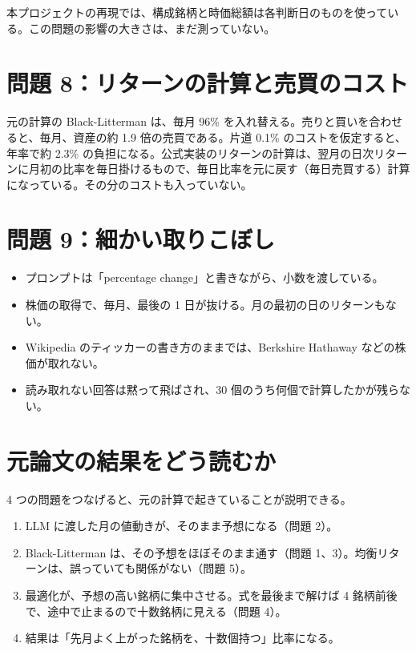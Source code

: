 \documentclass[xelatex,ja=standard,jafont=hiragino-pron,a4paper,10pt]{bxjsreport}
\begin{document}
本プロジェクトの再現では、構成銘柄と時価総額は各判断日のものを使っている。この問題の影響の大きさは、まだ測っていない。

\section{問題 8：リターンの計算と売買のコスト}

元の計算の Black-Litterman は、毎月 96\% を入れ替える。売りと買いを合わせると、毎月、資産の約 1.9 倍の売買である。片道 0.1\% のコストを仮定すると、年率で約 2.3\% の負担になる。公式実装のリターンの計算は、翌月の日次リターンに月初の比率を毎日掛けるもので、毎日比率を元に戻す（毎日売買する）計算になっている。その分のコストも入っていない。

\section{問題 9：細かい取りこぼし}

\begin{itemize}
\item プロンプトは「percentage change」と書きながら、小数を渡している。
\item 株価の取得で、毎月、最後の 1 日が抜ける。月の最初の日のリターンもない。
\item Wikipedia のティッカーの書き方のままでは、Berkshire Hathaway などの株価が取れない。
\item 読み取れない回答は黙って飛ばされ、30 個のうち何個で計算したかが残らない。
\end{itemize}

\section{元論文の結果をどう読むか}

4 つの問題をつなげると、元の計算で起きていることが説明できる。

\begin{enumerate}
\item LLM に渡した月の値動きが、そのまま予想になる（問題 2）。
\item Black-Litterman は、その予想をほぼそのまま通す（問題 1、3）。均衡リターンは、誤っていても関係がない（問題 5）。
\item 最適化が、予想の高い銘柄に集中させる。式を最後まで解けば 4 銘柄前後で、途中で止まるので十数銘柄に見える（問題 4）。
\item 結果は「先月よく上がった銘柄を、十数個持つ」比率になる。
\end{enumerate}
\end{document}

